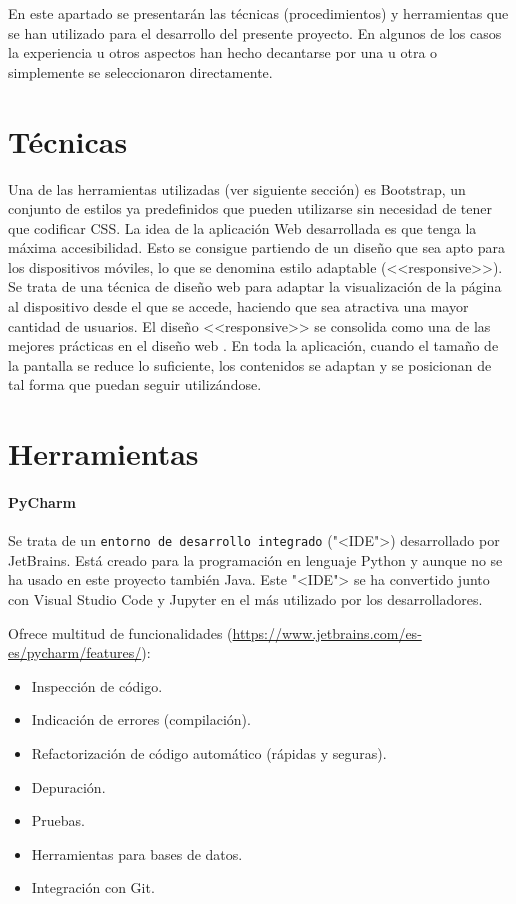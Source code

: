 
En este apartado se presentarán las técnicas (procedimientos) y herramientas que
se han utilizado para el desarrollo del presente proyecto. En algunos de los
casos la experiencia u otros aspectos han hecho decantarse por una u otra o
simplemente se seleccionaron directamente.

\section{Técnicas}

Una de las herramientas utilizadas (ver siguiente sección) es Bootstrap, un
conjunto de estilos ya predefinidos que pueden utilizarse sin necesidad de tener
que codificar CSS. La idea de la aplicación Web desarrollada es que tenga la
máxima accesibilidad. Esto se consigue partiendo de un diseño que sea apto para
los dispositivos móviles, lo que se denomina estilo adaptable (<<responsive>>).
Se trata de una técnica de diseño web para adaptar la visualización de la página
al dispositivo desde el que se accede, haciendo que sea atractiva una mayor
cantidad de usuarios. El diseño <<responsive>> se consolida como una de las
mejores prácticas en el diseño web \cite{40defiebre}. En toda la aplicación,
cuando el tamaño de la pantalla se reduce lo suficiente, los contenidos se
adaptan y se posicionan de tal forma que puedan seguir utilizándose.

\section{Herramientas}

\paragraph{PyCharm}
Se trata de un \texttt{entorno de desarrollo integrado} ("<IDE">) desarrollado por
JetBrains. Está creado para la programación en lenguaje Python y aunque no se ha
usado en este proyecto también Java. Este "<IDE"> se ha convertido junto con Visual
Studio Code y Jupyter en el más utilizado por los desarrolladores.

Ofrece multitud de funcionalidades (\url{https://www.jetbrains.com/es-es/pycharm/features/}):
\begin{itemize}
	\item Inspección de código.
	\item Indicación de errores (compilación).
	\item Refactorización de código automático (rápidas y seguras).
	\item Depuración.
	\item Pruebas.
	\item Herramientas para bases de datos.
	\item Integración con Git.
\end{itemize}


